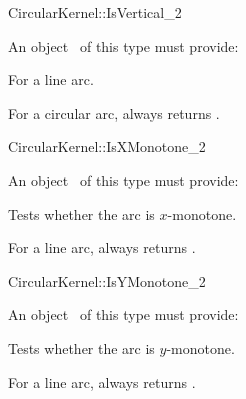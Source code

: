 



\begin{ccRefFunctionObjectConcept}{CircularKernel::IsVertical_2}


\ccRefines


An object \ccVar\ of this type must provide:

{For a line arc.}

{For a circular arc,  always returns .}

\end{ccRefFunctionObjectConcept}
\begin{ccRefFunctionObjectConcept}{CircularKernel::IsXMonotone_2}


An object \ccVar\ of this type must provide:

{Tests whether the arc is $x$-monotone.}

{For a line arc, always returns .}

\end{ccRefFunctionObjectConcept}
\begin{ccRefFunctionObjectConcept}{CircularKernel::IsYMonotone_2}


An object \ccVar\ of this type must provide:

{Tests whether the arc is $y$-monotone.}

{For a line arc, always returns .}

\end{ccRefFunctionObjectConcept}
